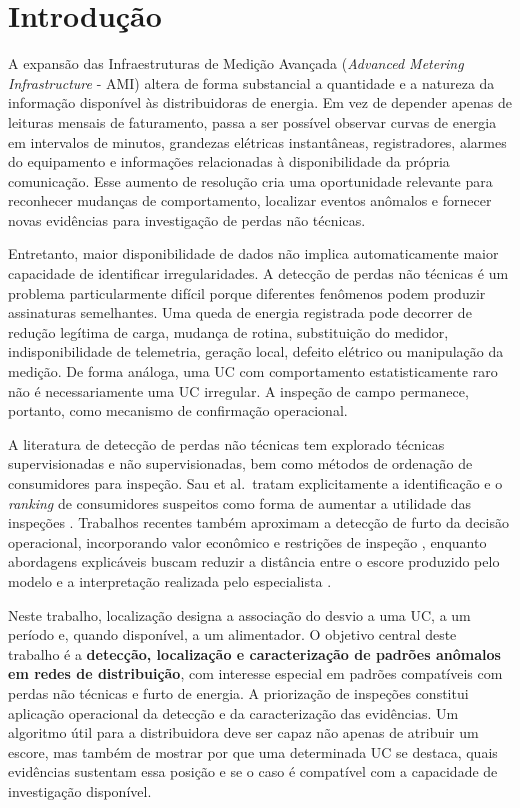 \chapter{Introdução}\label{introduuxe7uxe3o}

A expansão das Infraestruturas de Medição Avançada (\emph{Advanced Metering Infrastructure} - AMI) altera de forma substancial a quantidade e a natureza da informação disponível às distribuidoras de energia. Em vez de depender apenas de leituras mensais de faturamento, passa a ser possível observar curvas de energia em intervalos de minutos, grandezas elétricas instantâneas, registradores, alarmes do equipamento e informações relacionadas à disponibilidade da própria comunicação. Esse aumento de resolução cria uma oportunidade relevante para reconhecer mudanças de comportamento, localizar eventos anômalos e fornecer novas evidências para investigação de perdas não técnicas.

Entretanto, maior disponibilidade de dados não implica automaticamente maior capacidade de identificar irregularidades. A detecção de perdas não técnicas é um problema particularmente difícil porque diferentes fenômenos podem produzir assinaturas semelhantes. Uma queda de energia registrada pode decorrer de redução legítima de carga, mudança de rotina, substituição do medidor, indisponibilidade de telemetria, geração local, defeito elétrico ou manipulação da medição. De forma análoga, uma UC com comportamento estatisticamente raro não é necessariamente uma UC irregular. A inspeção de campo permanece, portanto, como mecanismo de confirmação operacional.

A literatura de detecção de perdas não técnicas tem explorado técnicas supervisionadas e não supervisionadas, bem como métodos de ordenação de consumidores para inspeção. Sau et al.~tratam explicitamente a identificação e o \emph{ranking} de consumidores suspeitos como forma de aumentar a utilidade das inspeções \autocite{sau2023}. Trabalhos recentes também aproximam a detecção de furto da decisão operacional, incorporando valor econômico e restrições de inspeção \autocite{han2026}, enquanto abordagens explicáveis buscam reduzir a distância entre o escore produzido pelo modelo e a interpretação realizada pelo especialista \autocite{pavlidis2026}.

Neste trabalho, localização designa a associação do desvio a uma UC, a um período e, quando disponível, a um alimentador. O objetivo central deste trabalho é a \textbf{detecção, localização e caracterização de padrões anômalos em redes de distribuição}, com interesse especial em padrões compatíveis com perdas não técnicas e furto de energia. A priorização de inspeções constitui aplicação operacional da detecção e da caracterização das evidências. Um algoritmo útil para a distribuidora deve ser capaz não apenas de atribuir um escore, mas também de mostrar por que uma determinada UC se destaca, quais evidências sustentam essa posição e se o caso é compatível com a capacidade de investigação disponível.

